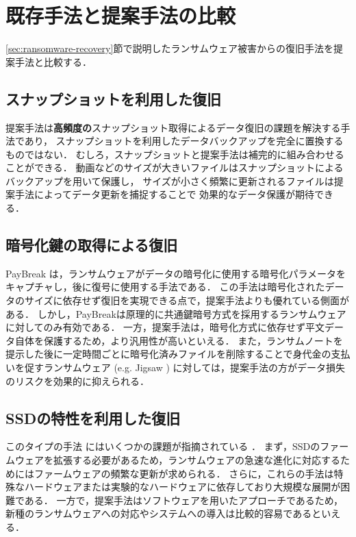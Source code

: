 \section{既存手法と提案手法の比較}
\ref{sec:ransomware-recovery}節で説明したランサムウェア被害からの復旧手法を提案手法と比較する．
\subsection{スナップショットを利用した復旧}
提案手法は\textbf{高頻度の}スナップショット取得によるデータ復旧の課題を解決する手法であり，
スナップショットを利用したデータバックアップを完全に置換するものではない．
むしろ，スナップショットと提案手法は補完的に組み合わせることができる．
動画などのサイズが大きいファイルはスナップショットによるバックアップを用いて保護し，
サイズが小さく頻繁に更新されるファイルは提案手法によってデータ更新を捕捉することで
効果的なデータ保護が期待できる．

\subsection{暗号化鍵の取得による復旧}
PayBreak \cite{kolodenker2017paybreak}は，ランサムウェアがデータの暗号化に使用する暗号化パラメータをキャプチャし，後に復号に使用する手法である．
この手法は暗号化されたデータのサイズに依存せず復旧を実現できる点で，提案手法よりも優れている側面がある．
しかし，PayBreakは原理的に共通鍵暗号方式を採用するランサムウェアに対してのみ有効である．
一方，提案手法は，暗号化方式に依存せず平文データ自体を保護するため，より汎用性が高いといえる．
また，ランサムノートを提示した後に一定時間ごとに暗号化済みファイルを削除することで身代金の支払いを促すランサムウェア (e.g. Jigsaw \cite{byrne2017jigsaw})
に対しては，提案手法の方がデータ損失のリスクを効果的に抑えられる．

\subsection{SSDの特性を利用した復旧}
このタイプの手法 \cite{huang2017flashguard,baek2018ssd} にはいくつかの課題が指摘されている \cite{wang2024ransom}．
まず，SSDのファームウェアを拡張する必要があるため，ランサムウェアの急速な進化に対応するためにはファームウェアの頻繁な更新が求められる．
さらに，これらの手法は特殊なハードウェアまたは実験的なハードウェアに依存しており大規模な展開が困難である．
一方で，提案手法はソフトウェアを用いたアプローチであるため，新種のランサムウェアへの対応やシステムへの導入は比較的容易であるといえる．

